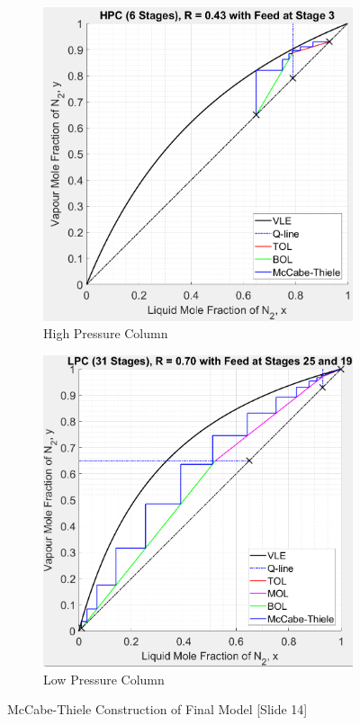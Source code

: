 \documentclass[11pt, oneside]{article}
\begin{document}
    \begin{figure}[ht]
        \begin{subfigure}{0.49\textwidth}
            \includegraphics[width=\linewidth]{airseparation/handouts/graphics/HPC_v1a.jpeg}
            \caption{High Pressure Column}
            \label{fig:HPC_v1}
        \end{subfigure}
        \hspace*{\fill} %
        \begin{subfigure}{0.49\textwidth}
            \includegraphics[width=\linewidth]{airseparation/handouts/graphics/LPC_v1a.jpeg}
            \caption{Low Pressure Column}
            \label{fig:LPC_v1}
        \end{subfigure}
        \caption{McCabe-Thiele Construction of Final Model [Slide 14]}
        \label{fig:mccabe_v1}
    \end{figure}
    
\end{document}
